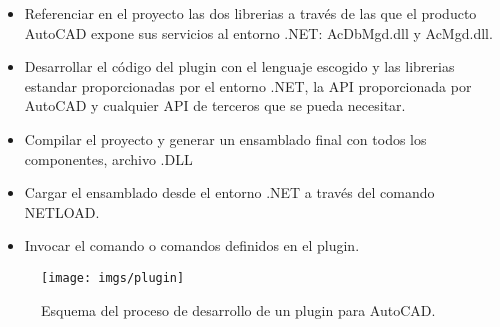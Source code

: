 \begin{itemize}

\item{Referenciar en el proyecto las dos librerias a través de las que el producto AutoCAD expone sus servicios al entorno .NET: AcDbMgd.dll y AcMgd.dll.}

\item{Desarrollar el código del plugin con el lenguaje escogido y las librerias estandar proporcionadas por el entorno .NET, la API proporcionada por AutoCAD y cualquier API de terceros que se pueda necesitar.}

\item{Compilar el proyecto y generar un ensamblado final con todos los componentes, archivo .DLL}

\item{Cargar el ensamblado desde el entorno .NET a través del comando NETLOAD.}

\item{Invocar el comando o comandos definidos en el plugin.}

\end{itemize}

\begin{figure}[H]
\begin{center}
\texttt{[image: imgs/plugin]}
\caption{Esquema del proceso de desarrollo de un plugin para AutoCAD.}
\end{center}
\end{figure}
